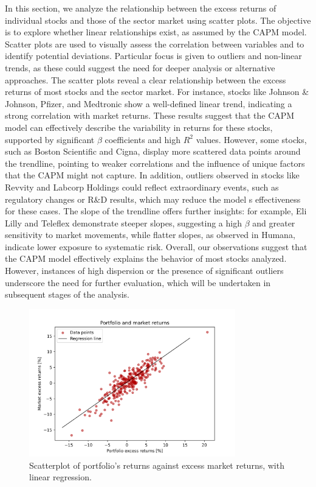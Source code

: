 In this section, we analyze the relationship between the excess returns of individual stocks and those of the sector market
using scatter plots.
The objective is to explore whether linear relationships exist, as assumed by the CAPM model. 
Scatter plots are used to visually assess the correlation between variables and to identify potential deviations.
Particular focus is given to outliers and non-linear trends, as these could suggest the need for deeper analysis or
alternative approaches.
The scatter plots reveal a clear relationship between the excess returns of most stocks and the sector market.
For instance, stocks like Johnson \& Johnson, Pfizer, and Medtronic show a well-defined linear trend, indicating a strong 
correlation with market returns. 
These results suggest that the CAPM model can effectively describe the variability in returns for these stocks, supported by
significant $\beta$ coefficients and high $R^2$ values.
However, some stocks, such as Boston Scientific and Cigna, display more scattered data points around the trendline, 
pointing to weaker correlations and the influence of unique factors that the CAPM might not capture.
In addition, outliers observed in stocks like Revvity and Labcorp Holdings could reflect extraordinary events, such as 
regulatory changes or R\&D results, which may reduce the model s effectiveness for these cases.
The slope of the trendline offers further insights: for example, Eli Lilly and Teleflex demonstrate steeper slopes,
suggesting a high $\beta$ and greater sensitivity to market movements, while flatter slopes, as observed in Humana, indicate
lower exposure to systematic risk.
Overall, our observations suggest that the CAPM model effectively explains the behavior of most stocks analyzed. 
However, instances of high dispersion or the presence of significant outliers underscore the need for further evaluation, 
which will be undertaken in subsequent stages of the analysis.

\begin{figure}[h]
    \centering
    \includegraphics[width=0.8\textwidth]{images/portfolio_regression.png}
    \caption{Scatterplot of portfolio's returns against excess market returns, with linear regression.}\label{fig:portfolio_regression}
\end{figure}